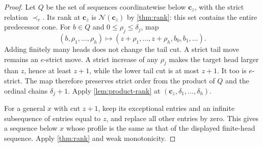 \documentclass[11pt,a4paper]{article}
\newtheorem{lemma}[theorem]{Lemma}
\theoremstyle{definition}
\newcommand{\ns}{\mathbin{\#}}
\newcommand{\OpN}{\mathcal N}
\newcommand{\dd}[2]{d(#1,#2)}
\newcommand{\tail}{\varepsilon}
\newcommand{\cseq}[1]{\mathbf c_{#1}}
\newcommand{\eord}{\mathrel{\prec_e}}
\begin{document}
\begin{proof}
Let $Q$ be the set of sequences coordinatewise below $\cseq{z}$, with the
strict relation $\eord$. Its rank at $\cseq{z}$ is $\OpN(\cseq{z})$ by
\cref{thm:rank}: this set contains the entire predecessor cone.
For $b\in Q$ and $0\le\rho_j\le\delta_j$, map
\[
 (b,\rho_1,\ldots,\rho_h)
 \longmapsto (z+\rho_1,\ldots,z+\rho_h,b_0,b_1,\ldots).
\]
Adding finitely many heads does not change the tail cut. A strict tail move
remains an $e$-strict move. A strict increase of any $\rho_j$ makes the target
head larger than $z$, hence at least $z+1$, while the lower tail cut is at
most $z+1$. It too is $e$-strict. The map therefore preserves strict order
from the product of $Q$ and the ordinal chains $\delta_j+1$.
Apply \cref{lem:product-rank} at
$(\cseq{z},\delta_1,\ldots,\delta_h)$.

For a general $x$ with cut $z+1$, keep its exceptional entries and an
infinite subsequence of entries equal to $z$, and replace all other entries
by zero. This gives a sequence below $x$ whose profile is the same as that
of the displayed finite-head sequence. Apply \cref{thm:rank} and weak
monotonicity.
\end{proof}
\end{document}
